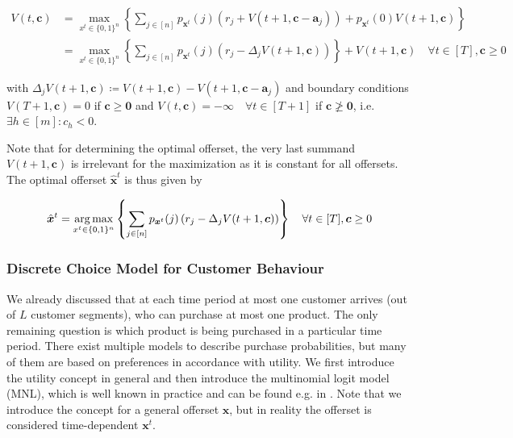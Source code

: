 
\begin{align}
V(t, \boldsymbol{c}) &= \max_{x^t \in \{0,1\}^n}\left\{ \sum_{j \in [n]} p_{\boldsymbol{x}^t}(j) \left( r_j + V(t+1, \boldsymbol{c} - \boldsymbol{a}_j) \right) + p_{\boldsymbol{x}^t}(0) V(t+1, \boldsymbol{c}) \right\} \label{eq:Bellman}\\
&= \max_{x^t \in \{0,1\}^n}\left\{ \sum_{j \in [n]} p_{\boldsymbol{x}^t}(j) \left( r_j - \Delta_j V(t+1, \boldsymbol{c}) \right) \right\} + V(t+1, \boldsymbol{c})\quad \forall t \in [T], \boldsymbol{c} \geq 0
\end{align}

with $\Delta_j V(t+1, \boldsymbol{c}) \coloneqq V(t+1, \boldsymbol{c}) - V(t+1, \boldsymbol{c} - \boldsymbol{a}_j)$ and boundary conditions $V(T+1, \boldsymbol{c}) = 0$ if $\boldsymbol{c} \geq \boldsymbol{0}$ and $V(t, \boldsymbol{c}) = - \infty \quad \forall t \in [T+1]$ if $\boldsymbol{c} \ngeq \boldsymbol{0}$, i.e. $\exists h \in [m]: c_h < 0$.

Note that for determining the optimal offerset, the very last summand $V(t+1, \boldsymbol{c})$ is irrelevant for the maximization as it is constant for all offersets. The optimal offerset $\hat{\boldsymbol{x}}^t$ is thus given by

\begin{align}
\hat{\boldsymbol{x}}^t = \operatorname*{arg\,max}_{x^t \in \{0,1\}^n}\left\{ \sum_{j \in [n]} p_{\boldsymbol{x}^t}(j) \left( r_j - \Delta_j V(t+1, \boldsymbol{c}) \right) \right\} \quad \forall t \in [T], \boldsymbol{c} \geq 0\label{eq:DP-optOffer}
\end{align}


\subsubsection{Discrete Choice Model for Customer Behaviour}\label{sss:DCM}


We already discussed that at each time period at most one customer arrives (out of $L$ customer segments), who can purchase at most one product. The only remaining question is which product is being purchased in a particular time period. There exist multiple models to describe purchase probabilities, but many of them are based on preferences in accordance with utility. We first introduce the utility concept in general and then introduce the multinomial logit model (MNL), which is well known in practice and can be found e.g. in \cite{Train.2009}. Note that we introduce the concept for a general offerset $\boldsymbol{x}$, but in reality the offerset is considered time-dependent $\boldsymbol{x}^t$.

